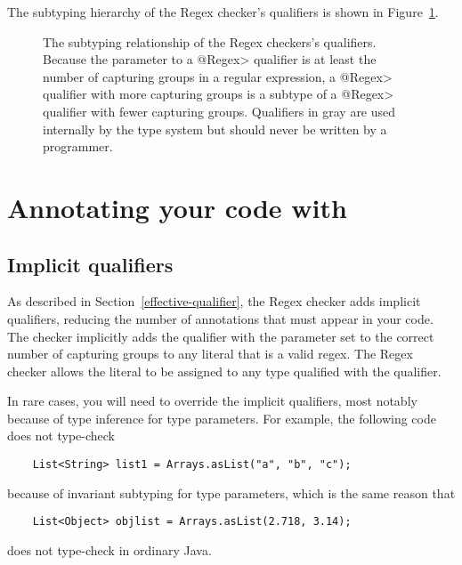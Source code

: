 The subtyping hierarchy of the Regex checker's qualifiers is shown in
Figure~\ref{fig:regex-hierarchy}.

\begin{figure}
\caption{The subtyping relationship of the Regex checkers's qualifiers.
  Because the parameter to a \<@Regex> qualifier is at least the number of
  capturing groups in a regular expression, a \<@Regex> qualifier with more
  capturing groups is a subtype of a \<@Regex> qualifier with fewer capturing
  groups. Qualifiers in gray are used internally by the type
  system but should never be written by a programmer.}
\label{fig:regex-hierarchy}
\end{figure}

\section{Annotating your code with \label{annotating-with-regex}}


\subsection{Implicit qualifiers\label{regex-implicit-qualifiers}}

As described in Section~\ref{effective-qualifier}, the Regex checker adds
implicit qualifiers, reducing the number of annotations that must appear
in your code. The checker implicitly adds the  qualifier with
the parameter set to the correct number of capturing groups to
any  literal that is a valid regex. The Regex checker allows
the  literal to be assigned to any type qualified with the
 qualifier.

In rare cases, you will need to override the implicit qualifiers, most
notably because of type inference for type parameters.  For
example, the following code does not type-check

\begin{Verbatim}
    List<String> list1 = Arrays.asList("a", "b", "c");
\end{Verbatim}

\noindent
because of invariant subtyping for type parameters, which is the same reason that

\begin{Verbatim}
    List<Object> objlist = Arrays.asList(2.718, 3.14);
\end{Verbatim}

\noindent
does not type-check in ordinary Java.

